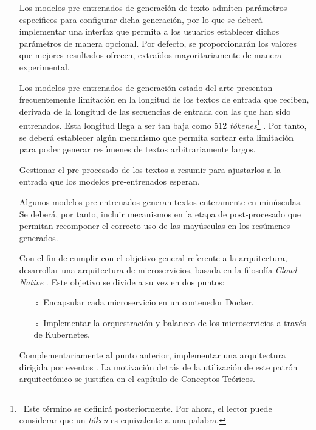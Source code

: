\begin{itemize}
	\item [\textbullet] Los modelos pre-entrenados de generación de texto admiten parámetros específicos para configurar dicha generación, por lo que se deberá implementar una interfaz que permita a los usuarios establecer dichos parámetros de manera opcional. Por defecto, se proporcionarán los valores que mejores resultados ofrecen, extraídos mayoritariamente de manera experimental.
	
	\item [\textbullet] Los modelos pre-entrenados de generación estado del arte presentan frecuentemente limitación en la longitud de los textos de entrada que reciben, derivada de la longitud de las secuencias de entrada con las que han sido entrenados. Esta longitud llega a ser tan baja como 512 \emph{tókenes}\footnote{\, Este término se definirá posteriormente. Por ahora, el lector puede considerar que un \emph{tóken} es equivalente a una palabra.} \cite{raffel19}. Por tanto, se deberá establecer algún mecanismo que permita sortear esta limitación para poder generar resúmenes de textos arbitrariamente largos.

	\item [\textbullet] Gestionar el pre-procesado de los textos a resumir para ajustarlos a la entrada que los modelos pre-entrenados esperan.

	\item [\textbullet] Algunos modelos pre-entrenados generan textos enteramente en minúsculas. Se deberá, por tanto, incluir mecanismos en la etapa de post-procesado que permitan recomponer el correcto uso de las mayúsculas en los resúmenes generados.

	\item [\textbullet] Con el fin de cumplir con el objetivo general referente a la arquitectura, desarrollar una arquitectura de microservicios, basada en la filosofía \emph{Cloud Native} \cite{cloud20, arundel19}. Este objetivo se divide a su vez en dos puntos:
	\begin{itemize}
		\item [◦] Encapsular cada microservicio en un contenedor Docker.
		\item [◦] Implementar la orquestración y balanceo de los microservicios a través de Kubernetes.
	\end{itemize}

	\item [\textbullet] Complementariamente al punto anterior, implementar una arquitectura dirigida por eventos \cite{bellemare20}. La motivación detrás de la utilización de este patrón arquitectónico se justifica en el capítulo de \hyperref[chapter:conceptos]{Conceptos Teóricos}.
	

\end{itemize}

